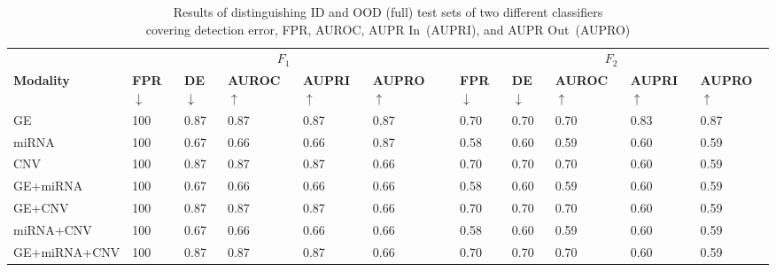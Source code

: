 \begin{table}
	\centering
	\caption{Results of distinguishing ID and OOD (full) test sets of two different classifiers\\ covering detection error, FPR, AUROC, AUPR In~(AUPRI), and AUPR Out~(AUPRO)} 
	\vspace{-4mm}
	\begin{tabular}{llllllllllll}
		&\multicolumn{5}{c}{\bfseries{$F_1$}} && \multicolumn{5}{c}{\bfseries{$F_2$}} \\	
		\cmidrule{2-6}\cmidrule{8-12}   
		\textbf{Modality}&\textbf{FPR$\downarrow$} & \textbf{DE$\downarrow$} & \textbf{AUROC$\uparrow$} & \textbf{AUPRI$\uparrow$} & \textbf{AUPRO$\uparrow$}
		&& \textbf{FPR$\downarrow$} & \textbf{DE$\downarrow$} & \textbf{AUROC$\uparrow$} & \textbf{AUPRI$\uparrow$} & \textbf{AUPRO$\uparrow$}\\
		\hline
		\multirow{1}{*}{{GE}} & 100 & 0.87 & 0.87 & 0.87 & 0.87 && 0.70 & 0.70 & 0.70 & 0.83 & 0.87\\
		\hline
		\multirow{1}{*}{{miRNA}} & 100 & 0.67 & 0.66 & 0.66 & 0.87 && 0.58 & 0.60 & 0.59 & 0.60 & 0.59\\
		\hline
		\multirow{1}{*}{{CNV}} & 100 & 0.87 & 0.87 & 0.87 & 0.66 && 0.70 & 0.70 & 0.70 & 0.60 & 0.59\\
		\hline
		\multirow{1}{*}{{GE+miRNA}} & 100 & 0.67 & 0.66 & 0.66 & 0.66 && 0.58 & 0.60 & 0.59 & 0.60 & 0.59\\
		\hline
		\multirow{1}{*}{{GE+CNV}} & 100 & 0.87 & 0.87 & 0.87 & 0.66 && 0.70 & 0.70 & 0.70 & 0.60 & 0.59\\
		\hline
		\multirow{1}{*}{{miRNA+CNV}} & 100 & 0.67 & 0.66 & 0.66 & 0.66 && 0.58 & 0.60 & 0.59 & 0.60 & 0.59\\
		\hline
		\multirow{1}{*}{{GE+miRNA+CNV}} & 100 & 0.87 & 0.87 & 0.87 & 0.66 && 0.70 & 0.70 & 0.70 & 0.60 & 0.59\\
		\hline
	\end{tabular} %
	\vspace{-2mm}
	\label{Table:OOD_result_2}
\end{table}

